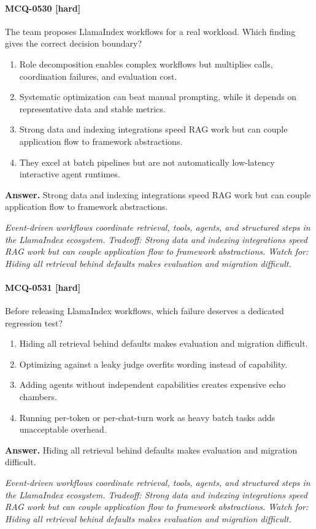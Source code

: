 \paragraph{MCQ-0530 [hard]} The team proposes LlamaIndex workflows for a real workload. Which finding gives the correct decision boundary?
\begin{enumerate}[label=\Alph*.]
\item Role decomposition enables complex workflows but multiplies calls, coordination failures, and evaluation cost.
\item Systematic optimization can beat manual prompting, while it depends on representative data and stable metrics.
\item Strong data and indexing integrations speed RAG work but can couple application flow to framework abstractions.
\item They excel at batch pipelines but are not automatically low-latency interactive agent runtimes.
\end{enumerate}
\noindent\textbf{Answer.} Strong data and indexing integrations speed RAG work but can couple application flow to framework abstractions.
\par\textit{Event-driven workflows coordinate retrieval, tools, agents, and structured steps in the LlamaIndex ecosystem. Tradeoff: Strong data and indexing integrations speed RAG work but can couple application flow to framework abstractions. Watch for: Hiding all retrieval behind defaults makes evaluation and migration difficult.}
\paragraph{MCQ-0531 [hard]} Before releasing LlamaIndex workflows, which failure deserves a dedicated regression test?
\begin{enumerate}[label=\Alph*.]
\item Hiding all retrieval behind defaults makes evaluation and migration difficult.
\item Optimizing against a leaky judge overfits wording instead of capability.
\item Adding agents without independent capabilities creates expensive echo chambers.
\item Running per-token or per-chat-turn work as heavy batch tasks adds unacceptable overhead.
\end{enumerate}
\noindent\textbf{Answer.} Hiding all retrieval behind defaults makes evaluation and migration difficult.
\par\textit{Event-driven workflows coordinate retrieval, tools, agents, and structured steps in the LlamaIndex ecosystem. Tradeoff: Strong data and indexing integrations speed RAG work but can couple application flow to framework abstractions. Watch for: Hiding all retrieval behind defaults makes evaluation and migration difficult.}

